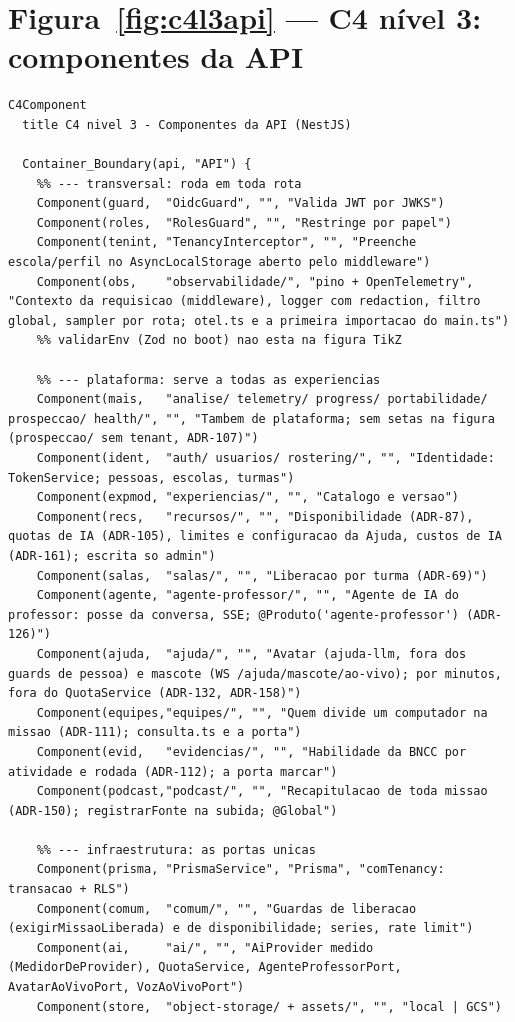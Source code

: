 \section{Figura~\ref{fig:c4l3api} --- C4 nível 3: componentes da API}

\begin{lstlisting}[language=mermaid]
C4Component
  title C4 nivel 3 - Componentes da API (NestJS)

  Container_Boundary(api, "API") {
    %% --- transversal: roda em toda rota
    Component(guard,  "OidcGuard", "", "Valida JWT por JWKS")
    Component(roles,  "RolesGuard", "", "Restringe por papel")
    Component(tenint, "TenancyInterceptor", "", "Preenche escola/perfil no AsyncLocalStorage aberto pelo middleware")
    Component(obs,    "observabilidade/", "pino + OpenTelemetry", "Contexto da requisicao (middleware), logger com redaction, filtro global, sampler por rota; otel.ts e a primeira importacao do main.ts")
    %% validarEnv (Zod no boot) nao esta na figura TikZ

    %% --- plataforma: serve a todas as experiencias
    Component(mais,   "analise/ telemetry/ progress/ portabilidade/ prospeccao/ health/", "", "Tambem de plataforma; sem setas na figura (prospeccao/ sem tenant, ADR-107)")
    Component(ident,  "auth/ usuarios/ rostering/", "", "Identidade: TokenService; pessoas, escolas, turmas")
    Component(expmod, "experiencias/", "", "Catalogo e versao")
    Component(recs,   "recursos/", "", "Disponibilidade (ADR-87), quotas de IA (ADR-105), limites e configuracao da Ajuda, custos de IA (ADR-161); escrita so admin")
    Component(salas,  "salas/", "", "Liberacao por turma (ADR-69)")
    Component(agente, "agente-professor/", "", "Agente de IA do professor: posse da conversa, SSE; @Produto('agente-professor') (ADR-126)")
    Component(ajuda,  "ajuda/", "", "Avatar (ajuda-llm, fora dos guards de pessoa) e mascote (WS /ajuda/mascote/ao-vivo); por minutos, fora do QuotaService (ADR-132, ADR-158)")
    Component(equipes,"equipes/", "", "Quem divide um computador na missao (ADR-111); consulta.ts e a porta")
    Component(evid,   "evidencias/", "", "Habilidade da BNCC por atividade e rodada (ADR-112); a porta marcar")
    Component(podcast,"podcast/", "", "Recapitulacao de toda missao (ADR-150); registrarFonte na subida; @Global")

    %% --- infraestrutura: as portas unicas
    Component(prisma, "PrismaService", "Prisma", "comTenancy: transacao + RLS")
    Component(comum,  "comum/", "", "Guardas de liberacao (exigirMissaoLiberada) e de disponibilidade; series, rate limit")
    Component(ai,     "ai/", "", "AiProvider medido (MedidorDeProvider), QuotaService, AgenteProfessorPort, AvatarAoVivoPort, VozAoVivoPort")
    Component(store,  "object-storage/ + assets/", "", "local | GCS")


\end{lstlisting}
